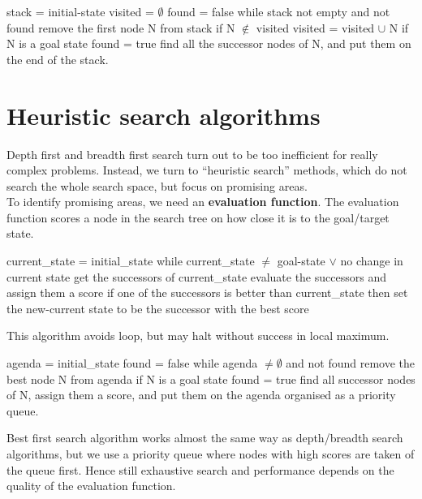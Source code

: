 \begin{algorithm}[caption={Variation of depth-first search.}, label={alg3}]
stack = {initial-state}
visited = $\emptyset$
found = false
while stack not empty and not found
    remove the first node N from stack
    if N $\notin$ visited
        visited = visited $\cup$ N
        if N is a goal state
            found = true
        find all the successor nodes of N, and put them on the end of the stack.
\end{algorithm}


\section{Heuristic search algorithms}
Depth first and breadth first search turn out to be too inefficient for really complex problems. Instead, we turn to “heuristic search” methods, which do not
search the whole search space, but focus on promising areas.\\
\linebreak 
To identify promising areas, we need an \textbf{evaluation function}. The evaluation function scores a node in the search tree on how close it is to the goal/target state.
\begin{algorithm}[caption={Hill climbing.}, label={alg4}]
current_state = initial_state
while current_state $\neq$ goal-state $\vee$ no change in current state
    get the successors of current_state
    evaluate the successors and assign them a score
    if one of the successors is better than current_state
        then set the new-current state to be the successor with the best score
\end{algorithm}
This algorithm avoids loop, but may halt without success in local maximum.

\begin{algorithm}[caption={Best first search.}, label={alg5}]
agenda = {initial_state}
found = false
while agenda $\neq \emptyset$ and not found
    remove the best node N from agenda
    if N is a goal state
        found = true
    find all successor nodes of N, assign them a score, and put them on the agenda organised as a priority queue.
\end{algorithm}
Best first search algorithm works almost the same way as depth/breadth search algorithms, but we use a priority queue where nodes with high scores are taken of the queue first. Hence still exhaustive search and performance depends on the quality of the evaluation function.

